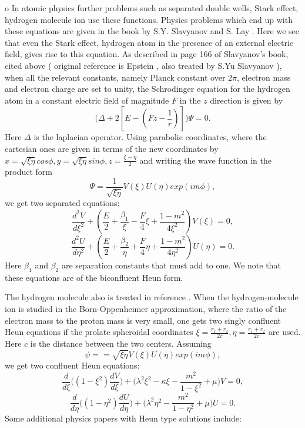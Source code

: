\documentclass{article}
\begin{document}
o In atomic physics further problems such as separated double
wells, Stark effect, hydrogen molecule ion use these functions.
Physics problems which end up with these equations are given in
the book by S.Y. Slavyanov and S. Lay \cite{Slavyanov}. Here we
see that even the Stark effect, hydrogen atom in the presence of
an external electric field, gives rise to this equation. As
described in page 166 of Slavyanov's book, cited above ( original
reference is Epstein \cite{Epstein}, also treated by S.Yu
Slavyanov \cite{Slav1}),  when all the relevant constants, namely
Planck constant over $ 2 \pi $, electron mass and electron charge
are set to unity, the Schrodinger equation for the hydrogen atom
in a constant electric field of magnitude $F$ in the $ z $
direction is given by
\begin{equation}
\Big( \Delta + 2[ E-(F z - \frac {1}{r})] \Big) \Psi = 0 .
\end{equation}%
Here $\Delta$ is the laplacian operator. Using parabolic
coordinates, where the cartesian ones are given in terms of the
new coordinates by $ x= \sqrt { \xi \eta} cos{\phi}, y= \sqrt {
\xi \eta} sin {\phi} , z= \frac {\xi-\eta}{2} $ and writing the
wave function in the product form
\begin{equation}
\Psi = \frac{1}{\sqrt {\xi \eta}} V(\xi) U(\eta) exp ( im\phi),
\end{equation}%
we get two separated equations:
\begin{equation}
\frac{d^2 V}{d \xi^2 } +(\frac{E}{2} +\frac{\beta_1}{\xi} - \frac
{F}{4} \xi + \frac {1-m^2} {4\xi^2}) V(\xi) = 0,
\end{equation}%
\begin{equation}
\frac{d^2 U }{d \eta^2} + (\frac{E}{2} + \frac{\beta_2 }{\eta} +
\frac{F}{4} \eta +  \frac {1-m^2}{4\eta^2}) U(\eta) =0.
\end{equation}%
Here $\beta_1 $ and $\beta_2$ are separation constants that must
add to one. We note that these equations are of the biconfluent
Heun form.


\noindent The hydrogen molecule also is treated in reference
\cite{slav131}. When the hydrogen-molecule ion is studied in the
Born-Oppenheimer approximation, where the ratio of the electron
mass to the proton mass is very small, one gets two singly
confluent Heun equations if the prolate spheroidal coordinates $
\xi = \frac{ r_1 + r_2}{2c}, \eta= \frac{ r_1 + r_2}{2c} $ are
used. Here $c$ is the distance between the two centers. Assuming
\begin {equation}
\psi = = \sqrt {\xi \eta} V(\xi) U(\eta) exp ( im\phi ),
\end{equation}%
we get two confluent Heun equations:
\begin{equation}
\frac {d}{d\xi} \Big( (1-\xi^2) \frac {dV}{d\xi} \Big) + \Big(
\lambda^2 \xi^2 -\kappa \xi - \frac {m^2}{1-\xi^2}+ \mu \Big) V =
0 ,
\end{equation}
\begin{equation}
\frac {d}{d\eta} \Big( (1-\eta^2) \frac {dU}{d\eta} \Big) + \Big(
\lambda^2 \eta^2 - \frac {m^2}{1-\eta^2} + \mu \Big) U = 0 .
\end{equation}
\noindent  Some additional  physics papers with Heun type solutions include:
\end{document}
